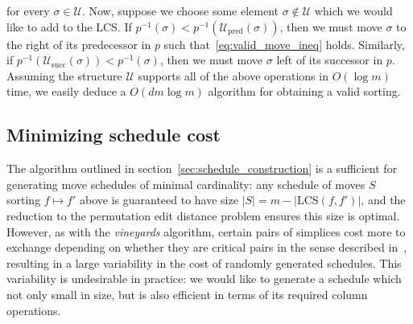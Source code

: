 \documentclass[sn-mathphys]{sn-jnl}
\begin{document}
  for every $\sigma \in \mathcal{U}$. Now, suppose we choose some element $\sigma \notin \mathcal{U}$ which we would like to add to the LCS. If $p^{-1}(\sigma) < p^{-1}(\mathcal{U}_{\mathrm{pred}}(\sigma))$, then we must move $\sigma$ to the right of its predecessor in $p$ such that~\eqref{eq:valid_move_ineq} holds. Similarly, if  $p^{-1}(\mathcal{U}_{\mathrm{succ}}(\sigma)) < p^{-1}(\sigma)$, then we must move $\sigma$ left of its successor in $p$. Assuming the structure $\mathcal{U}$ supports all of the above operations in $O(\log m)$ time, we easily deduce a $O(d m\log m)$ algorithm for obtaining a valid sorting.
 
 
\subsection{Minimizing schedule cost}\label{sec:schedule_cost}
The algorithm outlined in section~\ref{sec:schedule_construction} is a sufficient for generating move schedules of minimal cardinality: any schedule of moves $S$ sorting $f \mapsto f'$ above is guaranteed to have size $\lvert S \rvert = m - \lvert \mathrm{LCS}(f, f') \rvert$, and the reduction to the permutation edit distance problem ensures this size is optimal. 
However, as with the \emph{vineyards} algorithm, certain pairs of simplices cost more to exchange depending on whether they are critical pairs in the sense described in~\cite{cohen2006vines}, resulting in a large variability in the cost of randomly generated schedules. This variability is undesirable in practice: we would like to generate a schedule which not only small in size, but is also efficient in terms of its required column operations. 
\end{document}
